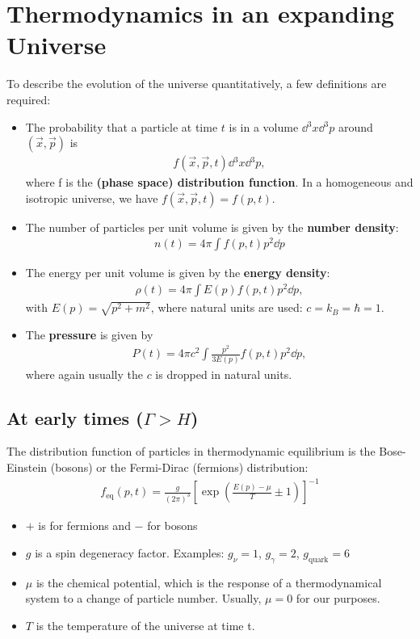 \section{Thermodynamics in an expanding Universe}

To describe the evolution of the universe quantitatively, a few definitions are required:

\begin{itemize}
	\item The probability that a particle at time $t$ is in a volume $\dd{^3 x} \dd{^3 p}$ around $(\vec{x}, \vec{p})$ is
	\begin{align*}
		f(\vec{x}, \vec{p}, t) \dd{^3 x} \dd{^3 p},
	\end{align*}
	where \gls{f} is the \textbf{(phase space) distribution function}.
	In a homogeneous and isotropic universe, we have $f(\vec{x}, \vec{p}, t) = f(p, t)$.
	\item The number of particles per unit volume is given by the \textbf{number density}:
	\begin{align*}
		n(t) = 4\pi \int f(p,t) p^2  \dd{p}
	\end{align*}
	\item The energy per unit volume is given by the \textbf{energy density}:
	\begin{align*}
		\rho(t) = 4 \pi \int E(p) f(p,t) p^2 \dd{p},
	\end{align*}
	with $E(p) = \sqrt{p^2 + m^2}$, where natural units are used: $c= k_B = \hbar = 1$.
	\item The \textbf{pressure} is given by
	\begin{align*}
		P(t) = 4 \pi c^2 \int \frac{p^2}{3 E(p)} f(p,t) p^2 \dd{p},
	\end{align*}
	where again usually the $c$ is dropped in natural units.
\end{itemize}


\subsection{At early times ($\Gamma > H$)}
\label{ssec:early-times}
The distribution function of particles in thermodynamic equilibrium is the Bose-Einstein (bosons) or the Fermi-Dirac (fermions) distribution:
\begin{align*}
	f_\text{eq}(p,t)
	= \frac{g}{(2\pi)^3} \left[ \exp\left( 
		\frac{E(p)-\mu}{T} \pm 1
	 \right) \right]^{-1}
\end{align*}
\begin{itemize}
	\item $+$ is for fermions and $-$ for bosons
	\item $g$ is a spin degeneracy factor. Examples: $g_\nu = 1$, $g_\gamma = 2$, $g_\text{quark} = 6$
	\item $\mu$ is the chemical potential, which is the response of a thermodynamical system to a change of particle number. Usually, $\mu=0$ for our purposes.
	\item $T$ is the temperature of the universe at time t.
\end{itemize}

